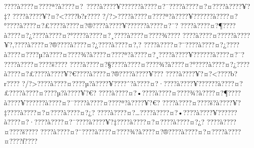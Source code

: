 \documentclass[11pt, openany]{book}
\begin{document}
???\textbar{}?à???\textbar{}?¤???\textbar{}?ª?à???\textbar{}?¤?~???\textbar{}?à???\textbar{}?¥?????\textbar{}?à???\textbar{}?¤?¯???\textbar{}?à???\textbar{}?¤?¤???\textbar{}?à???\textbar{}?¥?‡?
???\textbar{}?à???\textbar{}?¥?¤?\textless{}???\textbar{}?b?r???\textbar{}?
?/?\textgreater{}???\textbar{}?à???\textbar{}?¤???\textbar{}?ª?à???\textbar{}?¥?????\textbar{}?à???\textbar{}?¤?°???\textbar{}?à???\textbar{}?¤?£???\textbar{}?à???\textbar{}?¤?®???\textbar{}?à???\textbar{}?¥?????\textbar{}?à???\textbar{}?¤?¯?
???\textbar{}?à???\textbar{}?¤?¶???\textbar{}?à???\textbar{}?¤?¿???\textbar{}?à???\textbar{}?¤?°???\textbar{}?à???\textbar{}?¤?¸???\textbar{}?à???\textbar{}?¤???\textbar{}?¾???\textbar{}?
???\textbar{}?à???\textbar{}?¤?­???\textbar{}?à???\textbar{}?¥?‚???\textbar{}?à???\textbar{}?¤?®???\textbar{}?à???\textbar{}?¤?¿???\textbar{}?à???\textbar{}?¤?‚?
???\textbar{}?à???\textbar{}?¤?¨???\textbar{}?à???\textbar{}?¤?¿???\textbar{}?à???\textbar{}?¤???\textbar{}?µ?à???\textbar{}?¤???\textbar{}?¾?à???\textbar{}?¤???\textbar{}?ª?à???\textbar{}?¤?¸???\textbar{}?à???\textbar{}?¥?????\textbar{}?à???\textbar{}?¤?¯?
???\textbar{}?à???\textbar{}?¤???\textbar{}?š???\textbar{}?
???\textbar{}?à???\textbar{}?¤?§???\textbar{}?à???\textbar{}?¤???\textbar{}?¾?à???\textbar{}?¤?°???\textbar{}?à???\textbar{}?¤?¿???\textbar{}?à???\textbar{}?¤?£???\textbar{}?à???\textbar{}?¥?€???\textbar{}?à???\textbar{}?¤?®???\textbar{}?à???\textbar{}?¥???
???\textbar{}?à???\textbar{}?¥?¤?\textless{}???\textbar{}?b?r???\textbar{}?
?/?\textgreater{}???\textbar{}?à???\textbar{}?¤???\textbar{}?µ?à???\textbar{}?¥???\textbar{}?ˆ?à???\textbar{}?¤?·???\textbar{}?à???\textbar{}?¥?????\textbar{}?à???\textbar{}?¤?£???\textbar{}?à???\textbar{}?¤???\textbar{}?µ?à???\textbar{}?¥?€?
???\textbar{}?à???\textbar{}?¤?•???\textbar{}?à???\textbar{}?¤???\textbar{}?¾?à???\textbar{}?¤?¶???\textbar{}?à???\textbar{}?¥?????\textbar{}?à???\textbar{}?¤?¯???\textbar{}?à???\textbar{}?¤???\textbar{}?ª?à???\textbar{}?¥?€?
???\textbar{}?à???\textbar{}?¤???\textbar{}?š?à???\textbar{}?¥?‡???\textbar{}?à???\textbar{}?¤?¤???\textbar{}?à???\textbar{}?¤?¿?
???\textbar{}?à???\textbar{}?¤?\ldots{}???\textbar{}?à???\textbar{}?¤?•???\textbar{}?à???\textbar{}?¥?????\textbar{}?à???\textbar{}?¤?·???\textbar{}?à???\textbar{}?¤?¯???\textbar{}?à???\textbar{}?¥?‡???\textbar{}?à???\textbar{}?¤?¤???\textbar{}?à???\textbar{}?¤?¿?
???\textbar{}?à???\textbar{}?¤???\textbar{}?š???\textbar{}?
???\textbar{}?à???\textbar{}?¤?¨???\textbar{}?à???\textbar{}?¤???\textbar{}?¾?à???\textbar{}?¤?®???\textbar{}?à???\textbar{}?¤?¤???\textbar{}?à???\textbar{}?¤???\textbar{}?ƒ???\textbar{}?
\end{document}

